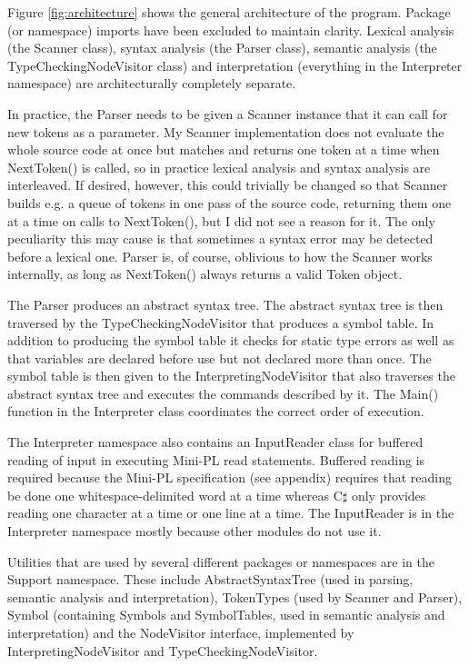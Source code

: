 \documentclass[a4paper,11pt]{article}
\begin{document}
Figure \ref{fig:architecture} shows the general architecture of the program. Package (or namespace) imports have been excluded to maintain clarity. Lexical analysis (the Scanner class), syntax analysis (the Parser class), semantic analysis (the TypeCheckingNodeVisitor class) and interpretation (everything in the Interpreter namespace) are architecturally completely separate.

In practice, the Parser needs to be given a Scanner instance that it can call for new tokens as a parameter. My Scanner implementation does not evaluate the whole source code at once but matches and returns one token at a time when NextToken() is called, so in practice lexical analysis and syntax analysis are interleaved. If desired, however, this could trivially be changed so that Scanner builds e.g. a queue of tokens in one pass of the source code, returning them one at a time on calls to NextToken(), but I did not see a reason for it. The only peculiarity this may cause is that sometimes a syntax error may be detected before a lexical one. Parser is, of course, oblivious to how the Scanner works internally, as long as NextToken() always returns a valid Token object.

The Parser produces an abstract syntax tree. The abstract syntax tree is then traversed by the TypeCheckingNodeVisitor that produces a symbol table. In addition to producing the symbol table it checks for static type errors as well as that variables are declared before use but not declared more than once. The symbol table is then given to the InterpretingNodeVisitor that also traverses the abstract syntax tree and executes the commands described by it. The Main() function in the Interpreter class coordinates the correct order of execution.

The Interpreter namespace also contains an InputReader class for buffered reading of input in executing Mini-PL read statements. Buffered reading is required because the Mini-PL specification (see appendix) requires that reading be done one whitespace-delimited word at a time whereas C$\sharp$ only provides reading one character at a time or one line at a time. The InputReader is in the Interpreter namespace mostly because other modules do not use it.

Utilities that are used by several different packages or namespaces are in the Support namespace. These include AbstractSyntaxTree (used in parsing, semantic analysis and interpretation), TokenTypes (used by Scanner and Parser), Symbol (containing Symbols and SymbolTables, used in semantic analysis and interpretation) and the NodeVisitor interface, implemented by InterpretingNodeVisitor and TypeCheckingNodeVisitor.
\end{document}
